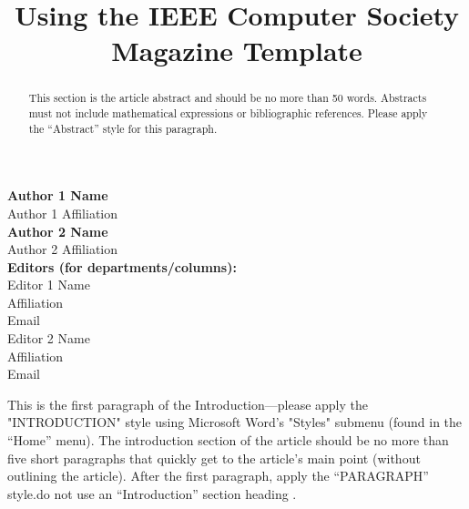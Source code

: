 \documentclass[9pt]{ieeeMicro}
\title{Using the IEEE Computer Society Magazine Template}
\begin{document}
	
\maketitle
\thispagestyle{empty}	


\begin{minipage}[t]{5cm}	

\begin{mdframed}[userdefinedwidth=0.9\textwidth,
							 leftmargin=0cm,
							 rightmargin=0.1cm,
							 ]
\small
\textbf{Author 1 Name} \\	
Author 1 Affiliation \\
\vspace{4pt}
\textbf{Author 2 Name} \\
Author 2 Affiliation\\
\vspace{4pt}
\textbf{Editors (for departments/columns):}\\
Editor 1 Name \\
Affiliation \\
Email \\
\vspace{4pt}
Editor 2 Name \\
Affiliation \\
Email \\


\end{mdframed}
\vspace{2pt}
\end{minipage}%
\begin{minipage}[t]{8cm}


\begin{abstract}
	
	This section is the article abstract and should be no more than 50 words. Abstracts must not include mathematical expressions or bibliographic references. Please apply the “Abstract” style for this
	paragraph.
	
\end{abstract}
\vspace{2em}	

This is the first paragraph of the Introduction—please apply the "INTRODUCTION" style using Microsoft Word’s "Styles" submenu (found in the “Home” menu). The introduction section of the article should be no more than five short paragraphs that quickly get to the article’s main point (without outlining the article). After the first paragraph, apply the “PARAGRAPH” style.do not use an “Introduction” section
heading \cite{tunali2017survey}.

\end{minipage} %
\end{document}
